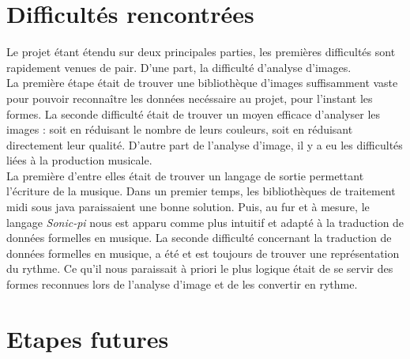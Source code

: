 \documentclass{article}
\begin{document}
\section{Difficultés rencontrées}
	Le projet étant étendu sur deux principales parties, les premières difficultés sont rapidement venues de pair. D'une part, la difficulté d'analyse d'images. \\
	La première étape était de trouver une bibliothèque d'images suffisamment vaste pour pouvoir reconnaître les données necéssaire au projet, pour l'instant les formes. La seconde difficulté était de trouver un moyen efficace d'analyser les images : soit en réduisant le nombre de leurs couleurs, soit en réduisant directement leur qualité. 
	D'autre part de l'analyse d'image, il y a eu les difficultés liées à la production musicale.\\
	La première d'entre elles était de trouver un langage de sortie permettant l'écriture de la musique. Dans un premier temps, les bibliothèques de traitement midi sous java paraissaient une bonne solution. Puis, au fur et à mesure, le langage \emph{Sonic-pi} nous est apparu comme plus intuitif et adapté à la traduction de données formelles en musique.
	La seconde difficulté concernant la traduction de données formelles en musique, a été et est toujours de trouver une représentation du rythme. Ce qu'il nous paraissait à priori le plus logique était de se servir des formes reconnues lors de l'analyse d'image et de les convertir en rythme.
\section{Etapes futures} 
\end{document}
